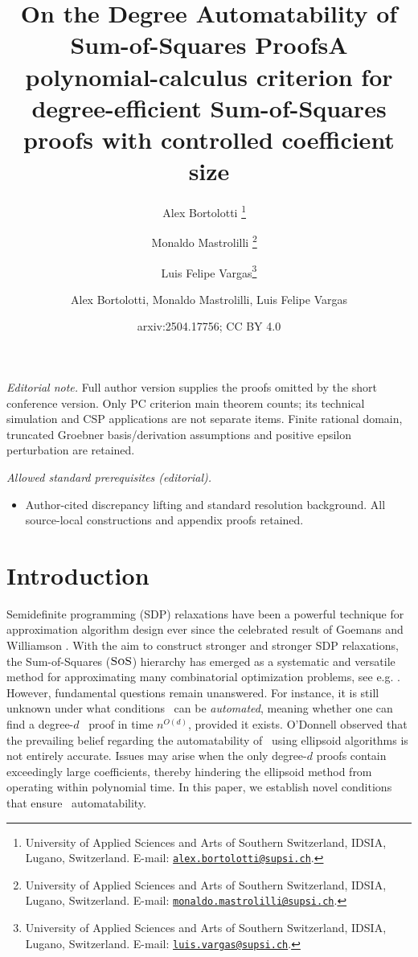 \documentclass[11pt]{article}
\title{On the Degree Automatability of Sum-of-Squares Proofs} %
\date{}
\author{Alex Bortolotti \thanks{University of Applied Sciences and Arts of Southern Switzerland, IDSIA, Lugano, Switzerland. E-mail: \href{mailto:alex.bortolotti@supsi.ch}{\texttt{alex.bortolotti@supsi.ch}}.} \  \and Monaldo Mastrolilli \thanks{University of Applied Sciences and Arts of Southern Switzerland, IDSIA, Lugano, Switzerland. E-mail: \href{mailto:monaldo.mastrolilli@supsi.ch}{\texttt{monaldo.mastrolilli@supsi.ch}}.} \ \and Luis Felipe Vargas\thanks{University of Applied Sciences and Arts of Southern Switzerland, IDSIA, Lugano, Switzerland. E-mail: \href{mailto:luis.vargas@supsi.ch}{\texttt{luis.vargas@supsi.ch}}.}}
\title{A polynomial-calculus criterion for degree-efficient Sum-of-Squares proofs with controlled coefficient size}
\author{Alex Bortolotti, Monaldo Mastrolilli, Luis Felipe Vargas}
\date{arxiv:2504.17756; CC BY 4.0}
\newcommand{\sos}{\text{\sc{SoS}}}
\newcommand{\1}{\textbf{1}}
\begin{document}
\maketitle
\noindent\textit{Editorial note.} Full author version supplies the proofs omitted by the short conference version. Only PC criterion main theorem counts; its technical simulation and CSP applications are not separate items. Finite rational domain, truncated Groebner basis/derivation assumptions and positive epsilon perturbation are retained.\par\medskip
\noindent\textit{Allowed standard prerequisites (editorial).}\begin{itemize}
\item Author-cited discrepancy lifting and standard resolution background. All source-local constructions and appendix proofs retained.
\end{itemize}\medskip
\section{Introduction}\label{sect:introduction}
Semidefinite programming (SDP) relaxations have been a powerful technique for approximation algorithm design ever since the celebrated result of Goemans and Williamson \cite{GoemansWilliamson1995}. With the aim to construct stronger and stronger SDP relaxations, the Sum-of-Squares ($\sos$) hierarchy has emerged as a systematic and versatile method for approximating many combinatorial optimization problems, see e.g. \cite{Lasserre2001, Parrilo03, FlemingKothariPitassi19, Laurent2009}.
However, fundamental questions remain unanswered. For instance, it is still unknown under what conditions \sos\ can be \emph{automated}, meaning whether one can find a degree-$d$ \sos\ proof in time $n^{O(d)}$, provided it exists.
%
O'Donnell \cite{odonnell2017} observed that the prevailing belief regarding the automatability of \sos\ using ellipsoid algorithms is not entirely accurate. Issues may arise when the only degree-$d$ proofs contain exceedingly large coefficients, thereby hindering the ellipsoid method from operating within polynomial time. 
In this paper, we establish novel conditions that ensure \sos\ automatability.
\end{document}
